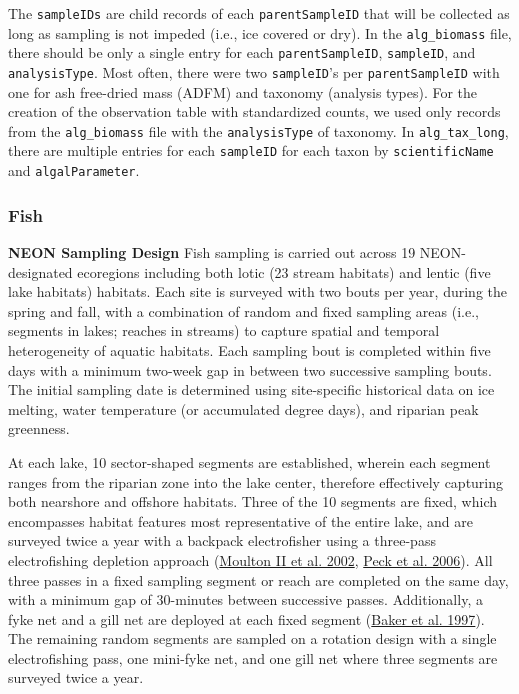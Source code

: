 \documentclass[
  12pt,
]{article}
\begin{document}
The \texttt{sampleIDs} are child records of each \texttt{parentSampleID} that will be collected as long as sampling is not impeded (i.e., ice covered or dry). In the \texttt{alg\_biomass} file, there should be only a single entry for each \texttt{parentSampleID}, \texttt{sampleID}, and \texttt{analysisType}. Most often, there were two \texttt{sampleID}'s per \texttt{parentSampleID} with one for ash free-dried mass (ADFM) and taxonomy (analysis types). For the creation of the observation table with standardized counts, we used only records from the \texttt{alg\_biomass} file with the \texttt{analysisType} of taxonomy. In \texttt{alg\_tax\_long}, there are multiple entries for each \texttt{sampleID} for each taxon by \texttt{scientificName} and \texttt{algalParameter}.

\hypertarget{fish}{%
\subsubsection{Fish}\label{fish}}

\textbf{NEON Sampling Design} Fish sampling is carried out across 19 NEON-designated ecoregions including both lotic (23 stream habitats) and lentic (five lake habitats) habitats. Each site is surveyed with two bouts per year, during the spring and fall, with a combination of random and fixed sampling areas (i.e., segments in lakes; reaches in streams) to capture spatial and temporal heterogeneity of aquatic habitats. Each sampling bout is completed within five days with a minimum two-week gap in between two successive sampling bouts. The initial sampling date is determined using site-specific historical data on ice melting, water temperature (or accumulated degree days), and riparian peak greenness.

At each lake, 10 sector-shaped segments are established, wherein each segment ranges from the riparian zone into the lake center, therefore effectively capturing both nearshore and offshore habitats. Three of the 10 segments are fixed, which encompasses habitat features most representative of the entire lake, and are surveyed twice a year with a backpack electrofisher using a three-pass electrofishing depletion approach (\protect\hyperlink{ref-moulton2002revised}{Moulton II et al. 2002}, \protect\hyperlink{ref-peck2006environmental}{Peck et al. 2006}). All three passes in a fixed sampling segment or reach are completed on the same day, with a minimum gap of 30-minutes between successive passes. Additionally, a fyke net and a gill net are deployed at each fixed segment (\protect\hyperlink{ref-baker1997environmental}{Baker et al. 1997}). The remaining random segments are sampled on a rotation design with a single electrofishing pass, one mini-fyke net, and one gill net where three segments are surveyed twice a year.
\end{document}

